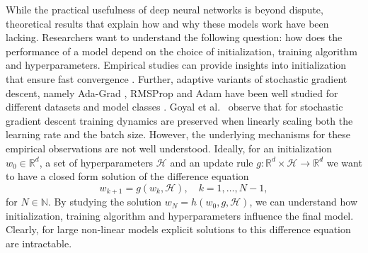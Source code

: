 \documentclass[12pt]{article}
\theoremstyle{definition}
\numberwithin{equation}{section}
\newcommand{\N}{\mathbb{N}}
\newcommand{\R}{\mathbb{R}}
\newcommand{\CH}{\mathcal{H}}
\begin{document}
While the practical usefulness of deep neural networks is beyond dispute, theoretical results that explain how and why these models work have been lacking. Researchers want to understand the following question: how does the performance of a model depend on the choice of initialization, training algorithm and hyperparameters. Empirical studies can provide insights into initialization that ensure fast convergence \cite{glorotUnderstandingDifficultyTraining2010, heDelvingDeepRectifiers2015a}. Further, adaptive variants of stochastic gradient descent, namely Ada-Grad \cite{duchiAdaptiveSubgradientMethods2011}, RMSProp \cite{geoffreyhintonnitishsrivastavaandkevinswer-NeuralNetworksMachine2012} and Adam \cite{kingmaAdamMethodStochastic2017} have been well studied for different datasets and model classes \cite{wilsonMarginalValueAdaptive2017}. Goyal et al.\ \cite{goyalAccurateLargeMinibatch2018} observe that for stochastic gradient descent training dynamics are preserved when linearly scaling both the learning rate and the batch size. 
However, the underlying mechanisms for these empirical observations are not well understood. Ideally, for an initialization $w_0 \in \R^d$, a set of hyperparameters $\CH$ and an update rule $g : \R^d \times \CH \rightarrow \R^d$ we want to have a closed form solution of the difference equation
\begin{equation*}
  w_{k+1} = g(w_k, \CH), \quad k=1,\dots, N-1,
\end{equation*}
for $N \in \N$.
By studying the solution $w_N = h(w_0, g, \CH)$, we can understand how initialization, training algorithm and hyperparameters influence the final model. Clearly, for large non-linear models explicit solutions to this difference equation are intractable. 
\end{document}
